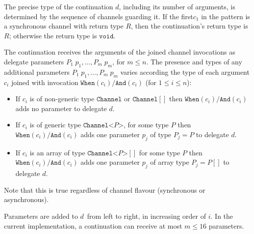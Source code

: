 \documentclass{article}
\newcommand{\maxbindings}{16}
\newcommand{\dreturnvoid}[1]{{\texttt{Continuation}}}
\newcommand{\When}{\texttt{When}}
\newcommand{\And}{\texttt{And}}
\newcommand{\AndPair}{\texttt{AndPair}}
\newcommand{\channel}{\ensuremath{c}}
\newcommand{\delegate}{\ensuremath{d}}
\newcommand{\tvarr}{\ensuremath{R}}
\begin{document}
The precise type of the continuation \delegate, including its number of arguments, is determined by the sequence of channels guarding it.
If the first$\channel_1$ in the pattern is a synchronous  channel with return type $\tvarr$, then
the continuation's return type is $\tvarr$; otherwise the return type is $\texttt{void}$.


The continuation receives the arguments of the joined channel invocations 
as delegate parameters $P_1\;p_1, \ldots,  P_m\;p_m$, for $m\leq n$.
The presence and types of any additional parameters $P_1\;p_1, \ldots,  P_m\;p_m$
varies according the type of each argument $\channel_i$ joined with 
invocation $\When(\channel_i)/\And(\channel_i)$ (for $1\leq i\leq n$):

\begin{itemize}
\item
If $\channel_i$ is of non-generic type $\texttt{Channel}$ or $\texttt{Channel}[]$ then $\When(\channel_i)/\And(\channel_i)$ adds no parameter to delegate \delegate.

\item
If $\channel_i$ is of generic type $\texttt{Channel<}P\texttt{>}$,  for some type $P$ then $\When(\channel_i)/\And(\channel_i)$ 
adds one parameter $p_j$ of type $P_j=P$ to delegate \delegate.

\item
If $\channel_i$ is an array of type $\texttt{Channel<}P\texttt{>}[]$ for some type $P$ then $\When(\channel_i)/\And(\channel_i)$ 
adds one parameter $p_j$ of array type $P_j=P[]$ to delegate \delegate.
\end{itemize}

Note that this is true regardless of channel flavour (synchronous or asynchronous).

Parameters are added to \delegate\ from left to right, in increasing order of 
$i$. In the current implementation, a continuation can receive at most $m\leq\maxbindings$ parameters.

\end{document}
